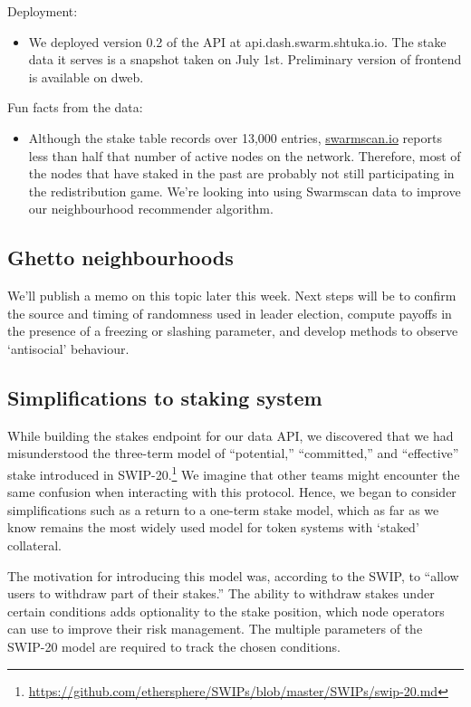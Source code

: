 Deployment:
%
\begin{itemize}
\item We deployed version 0.2 of the API at api.dash.swarm.shtuka.io. The stake data it serves is a snapshot taken on July 1st. Preliminary version of frontend is available on dweb.
\end{itemize}

Fun facts from the data:
%
\begin{itemize}
\item 
  Although the stake table records over 13,000 entries, \url{swarmscan.io} reports less than half that number of active nodes on the network.
  Therefore, most of the nodes that have staked in the past are probably not still participating in the redistribution game.
  We're looking into using Swarmscan data to improve our neighbourhood recommender algorithm.

\end{itemize}

\subsection*{Ghetto neighbourhoods}

We'll publish a memo on this topic later this week.
%
Next steps will be to confirm the source and timing of randomness used in leader election, compute payoffs in the presence of a freezing or slashing parameter, and develop methods to observe `antisocial' behaviour.

\subsection*{Simplifications to staking system}

While building the stakes endpoint for our data API, we discovered that we had misunderstood the three-term model of ``potential,'' ``committed,'' and ``effective'' stake introduced in SWIP-20.\footnote{\url{https://github.com/ethersphere/SWIPs/blob/master/SWIPs/swip-20.md}}
%
We imagine that other teams might encounter the same confusion when interacting with this protocol.
%
Hence, we began to consider simplifications such as a return to a one-term stake model, which as far as we know remains the most widely used model for token systems with `staked' collateral.

The motivation for introducing this model was, according to the SWIP, to ``allow users to withdraw part of their stakes.''
%
The ability to withdraw stakes under certain conditions adds optionality to the stake position, which node operators can use to improve their risk management.
%
The multiple parameters of the SWIP-20 model are required to track the chosen conditions.

